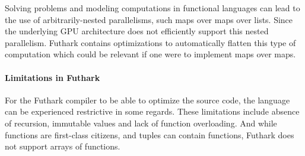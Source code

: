 Solving problems and modeling computations in functional languages can lead to
the use of arbitrarily-nested parallelisms, such maps over maps over lists.
Since the underlying GPU architecture does not efficiently support this nested
parallelism.  Futhark contains optimizations to automatically flatten this type
of computation which could be relevant if one were to implement maps over maps.

\paragraph{Limitations in Futhark} For the Futhark compiler to be able to
optimize the source code, the language can be experienced restrictive in some
regards.  These limitations include absence of recursion, immutable values and
lack of function overloading.  And while functions are first-class citizens,
and tuples can contain functions, Futhark does not support arrays of functions.
